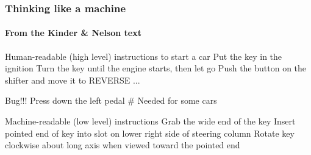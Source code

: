 \documentclass[hyperref={colorlinks=true}]{beamer}
\begin{document}
\begin{frame}[fragile]
  \frametitle{Thinking like a machine}
  \framesubtitle{From the Kinder \& Nelson text}
    
    
  \pause
  
  \begin{ucpythonblock}{Human-readable (high level) instructions to start a car}
    Put the key in the ignition
    Turn the key until the engine starts, 
        then let go
    Push the button on the shifter and move it 
        to REVERSE
    ...
  \end{ucpythonblock}

  \pause

  \begin{ucpythonblock}{Bug!!!}
    Press down the left pedal # Needed for some cars
  \end{ucpythonblock}
  
  \pause

  \begin{ucpythonblock}{Machine-readable (low level) instructions}
    Grab the wide end of the key
    Insert pointed end of key into slot on lower 
        right side of steering column
    Rotate key clockwise about long axis when viewed 
        toward the pointed end
  \end{ucpythonblock}
  
  
\end{frame}

\end{document}
